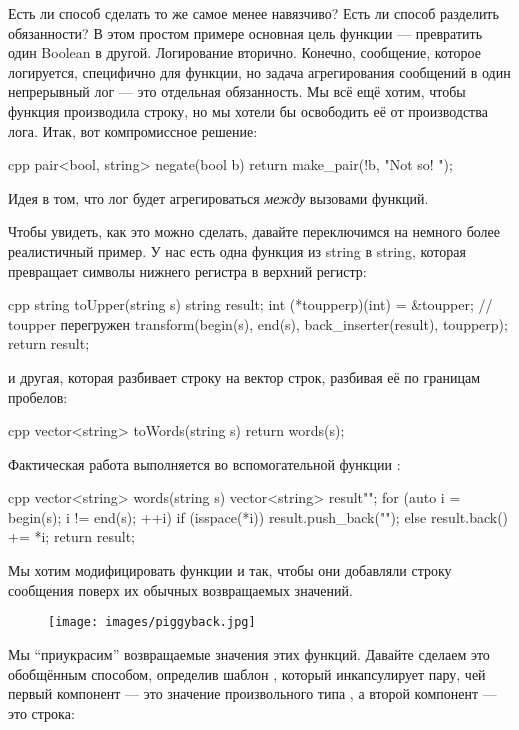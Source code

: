 Есть ли способ сделать то же самое менее навязчиво? Есть ли способ
разделить обязанности? В этом простом примере основная цель
функции  --- превратить один Boolean в другой.
Логирование вторично. Конечно, сообщение, которое логируется, специфично для
функции, но задача агрегирования сообщений в один
непрерывный лог --- это отдельная обязанность. Мы всё ещё хотим, чтобы функция
производила строку, но мы хотели бы освободить её от производства лога. Итак,
вот компромиссное решение:

\begin{snip}{cpp}
pair<bool, string> negate(bool b) {
    return make_pair(!b, "Not so! ");
}
\end{snip}
Идея в том, что лог будет агрегироваться \emph{между} вызовами
функций.

Чтобы увидеть, как это можно сделать, давайте переключимся на немного более реалистичный
пример. У нас есть одна функция из string в string, которая превращает символы нижнего
регистра в верхний регистр:

\begin{snip}{cpp}
string toUpper(string s) {
    string result;
    int (*toupperp)(int) = &toupper; // toupper перегружен
    transform(begin(s), end(s), back_inserter(result), toupperp);
    return result;
}
\end{snip}
и другая, которая разбивает строку на вектор строк, разбивая её
по границам пробелов:

\begin{snip}{cpp}
vector<string> toWords(string s) {
    return words(s);
}
\end{snip}
Фактическая работа выполняется во вспомогательной функции :

\begin{snip}{cpp}
vector<string> words(string s) {
    vector<string> result{""};
    for (auto i = begin(s); i != end(s); ++i)
    {
        if (isspace(*i))
            result.push_back(""); 
        else
            result.back() += *i;
    }
    return result;
}
\end{snip}
Мы хотим модифицировать функции  и  так,
чтобы они добавляли строку сообщения поверх их обычных возвращаемых
значений.

\begin{figure}[H]
  \centering
  \texttt{[image: images/piggyback.jpg]}
\end{figure}
\noindent
Мы ``приукрасим'' возвращаемые значения этих функций. Давайте сделаем это
обобщённым способом, определив шаблон , который
инкапсулирует пару, чей первый компонент --- это значение произвольного типа
, а второй компонент --- это строка:

